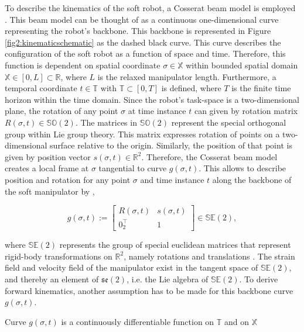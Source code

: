 To describe the kinematics of the soft robot, a Cosserat beam model is employed \cite{Boyer2019}. This beam model can be thought of as a continuous one-dimensional curve representing the robot's backbone. This backbone is represented in Figure \ref{fig2:kinematicschematic} as the dashed black curve. This curve describes the configuration of the soft robot as a function of space and time. Therefore, this function is dependent on spatial coordinate $\sigma \in \mathbb{X}$ within bounded spatial domain $\mathbb{X} \in [0,L] \subset \mathbb{R}$, where $L$ is the relaxed manipulator length. Furthermore, a temporal coordinate $t \in \mathbb{T}$ with $\mathbb{T} \subset [0,T]$ is defined, where $T$ is the finite time horizon within the time domain. Since the robot's task-space is a two-dimensional plane, the rotation of any point $\sigma$ at time instance $t$ can given by rotation matrix $R(\sigma,t) \in \mathbb{SO}(2)$. The matrices in $\mathbb{SO}(2)$ represent the special orthogonal group within Lie group theory. This matrix expresses rotation of points on a two-dimensional surface relative to the origin. Similarly, the position of that point is given by position vector $s(\sigma,t) \in \mathbb{R}^2$. Therefore, the Cosserat beam model creates a local frame at $\sigma$ tangential to curve $g(\sigma,t)$. This allows to describe position and rotation for any point $\sigma$ and time instance $t$ along the backbone of the soft manipulator by \cite{Caasenbrood2020},


\begin{equation}
    g(\sigma,t) := \begin{bmatrix}  R(\sigma,t) & s(\sigma,t) \\ 0_2^\top & 1 \end{bmatrix} \in \mathbb{SE}(2),
    \label{eq2:g}
\end{equation}

where $\mathbb{SE}(2)$ represents the group of special euclidean matrices that represent rigid-body transformations on $\mathbb{R}^2$, namely rotations and translations \cite{Sola2018}. The strain field and velocity field of the manipulator exist in the tangent space of $\mathbb{SE}(2)$, and thereby an element of $\mathfrak{se}(2)$, i.e. the Lie algebra of $\mathbb{SE}(2)$. To derive forward kinematics, another assumption has to be made for this backbone curve $g(\sigma,t)$.

\begin{theorem}
Curve  $g(\sigma,t)$ is a continuously differentiable function on $\mathbb{T}$ and on $\mathbb{X}$
\end{theorem}

